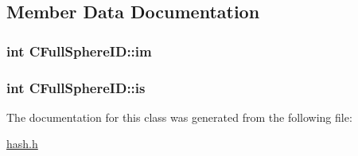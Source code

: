 \subsection{Member Data Documentation}
\hypertarget{classCFullSphereID_a50ef0261eac4aa50470938544de904bf}{
\subsubsection[{im}]{\setlength{\rightskip}{0pt plus 5cm}int C\-Full\-Sphere\-I\-D\-::im}}\label{classCFullSphereID_a50ef0261eac4aa50470938544de904bf}
\hypertarget{classCFullSphereID_abfe8fd426e07fa9a9ebbeb3a9f21b498}{
\subsubsection[{is}]{\setlength{\rightskip}{0pt plus 5cm}int C\-Full\-Sphere\-I\-D\-::is}}\label{classCFullSphereID_abfe8fd426e07fa9a9ebbeb3a9f21b498}


The documentation for this class was generated from the following file\-:\begin{DoxyCompactItemize}
\item 
\hyperlink{hash_8h}{hash.\-h}\end{DoxyCompactItemize}
